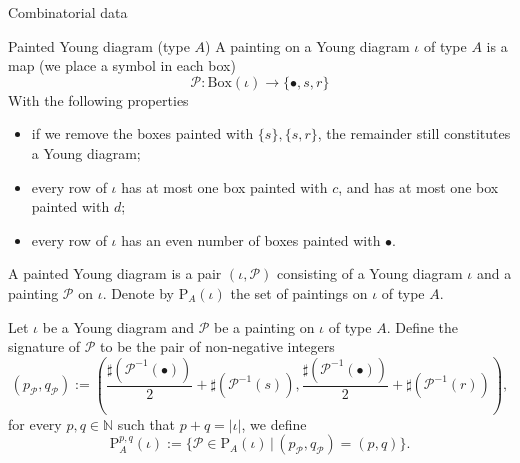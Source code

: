\documentclass[fleqn,xcolor=dvipsnames]{beamer}
\newcommand{\BN}{{\mathbb {N}}}
\newcommand{\CP}{{\mathcal {P}}}
\newcommand{\set}[2]{\{#1\,|\,#2\}}
\begin{document}
\begin{frame}{Combinatorial data}
  \begin{block}{Painted Young diagram (type $A$)}
    A painting on a Young diagram $\iota$ of type $A$ is a map (we place a symbol in each box)
   $$\CP : \mathrm{Box}(\iota) \to \{ \bullet, s ,r \}$$
   With the following properties

   \begin{itemize}
      \item if we remove the boxes painted with $\{s\}, \{s,r\}$, the remainder still constitutes a Young diagram;
      \item every row of $\iota$ has at most one box painted with $c$, and has at most one box painted with $d$;
      \item every row of $\iota$ has an even number of boxes painted with $\bullet$.
   \end{itemize}
    A painted Young diagram is a pair $(\iota, \CP)$ consisting of a Young diagram $\iota$ and a painting $\CP$ on $\iota$. Denote by $\mathrm{P}_{A}(\iota)$ the set of paintings on $\iota$ of type $A$.
    
  \end{block}
\end{frame}






\begin{frame}
  Let $\iota$ be a Young diagram and $\CP$ be a painting on $\iota$ of type $A$. Define the signature of $\CP$ to be the pair of non-negative integers
   \begin{equation*}
    \left(p_{\CP}, q_{\CP}\right) := \left(\frac{\sharp(\CP^{-1}(\bullet))}{2} + \sharp(\CP^{-1}(s)), \frac{\sharp(\CP^{-1}(\bullet))}{2}+ \sharp(\CP^{-1}(r))\right),
   \end{equation*}
   for every $p,q \in \BN$ such that $p + q = |\iota|$, we define
   \begin{equation*}
        \mathrm{P}_{A}^{p,q}(\iota) := \set{\CP \in \mathrm{P}_{A}(\iota)}{(p_{\CP},q_{\CP}) = (p,q)}.       
   \end{equation*}
\end{frame}
\end{document}
